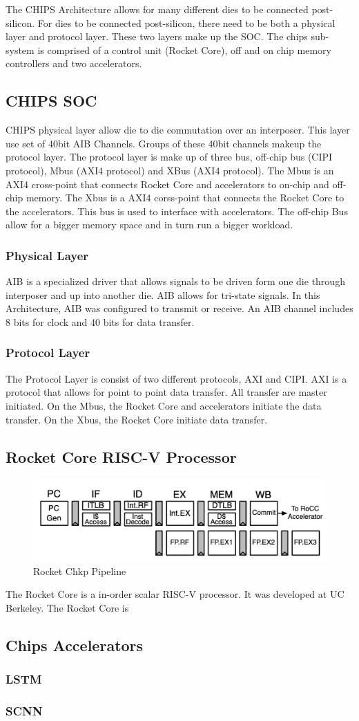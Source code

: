 \documentclass[../main.tex]{subfiles}
\begin{document}
The CHIPS Architecture allows for many different dies to be connected post-silicon. For dies to be connected post-silicon, there need to be both a physical layer and protocol layer. These two layers make up the SOC. The chips sub-system is comprised of a control unit (Rocket Core), off and on chip memory controllers and two accelerators.
\subsection{CHIPS SOC}
CHIPS physical layer allow die to die commutation over an interposer. This layer use set of 40bit AIB Channels. Groups of these 40bit channels makeup the protocol layer. The protocol layer is make up of three bus, off-chip bus (CIPI protocol), Mbus (AXI4 protocol) and XBus (AXI4 protocol). The Mbus is an AXI4 cross-point that connects Rocket Core and accelerators to on-chip and off-chip memory. The Xbus is a AXI4 corss-point that connects the Rocket Core to the accelerators. This bus is used to interface with accelerators. The off-chip Bus allow for a bigger memory space and in turn run a bigger workload.
\subsubsection{Physical Layer}
AIB is a specialized driver that allows signals to be driven form one die through interposer and up into another die. AIB allows for tri-state signals. In this Architecture, AIB was configured to transmit or receive. An AIB channel includes 8 bits for clock and 40 bits for data transfer. 
\subsubsection{Protocol Layer}
The Protocol Layer is consist of two different protocols, AXI and CIPI. AXI is a protocol that allows for point to point data transfer. All transfer are master initiated. On the Mbus, the Rocket Core and accelerators initiate the data transfer. On the Xbus, the Rocket Core initiate data transfer. 
\subsection{Rocket Core RISC-V Processor}
\begin{figure}[H]
    \centering
    \includegraphics[scale=.4]{pngs/RocketPipeline.png}
    \caption{Rocket Chkp Pipeline\cite{Asanović:EECS-2016-17}}
    \label{fig:RocketChipPipeline}
\end{figure}
The Rocket Core is a in-order scalar RISC-V processor. It was developed at UC Berkeley. The Rocket Core is 
\subsection{Chips Accelerators}
\subsubsection{LSTM}
\blindtext
\subsubsection{SCNN}
\blindtext
\end{document}
